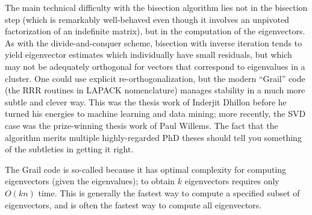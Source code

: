 \documentclass[12pt, leqno]{article} %
\begin{document}
The main technical difficulty with the bisection algorithm lies not
in the bisection step (which is remarkably well-behaved even though
it involves an unpivoted factorization of an indefinite matrix),
but in the computation of the eigenvectors.  As with the divide-and-conquer
scheme, bisection with inverse iteration tends to yield eigenvector
estimates which individually have small residuals, but which may not be
adequately orthogonal for vectors that correspond to eigenvalues in a
cluster.  One could use explicit re-orthogonalization, but the modern
``Grail'' code (the RRR routines in LAPACK nomenclature) manages
stability in a much more subtle and clever way.
This was the thesis work of Inderjit Dhillon before he turned his
energies to machine learning and data mining; more recently, the SVD
case was the prize-winning thesis work of Paul Willems.  The fact that
the algorithm merits multiple highly-regarded PhD theses should tell
you something of the subtleties in getting it right.

The Grail code is so-called because it has optimal complexity for
computing eigenvectors (given the eigenvalues); to obtain $k$ eigenvectors
requires only $O(kn)$ time.  This is generally the fastest way to
compute a specified subset of eigenvectors, and is often the fastest
way to compute all eigenvectors.
\end{document}
